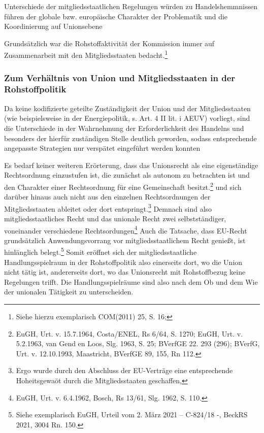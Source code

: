 \documentclass[12pt,a4paper,oneside]{book} %
\begin{document}
	Unterschiede der mitgliedsstaatlichen Regelungen würden zu Handelshemmnissen führen
	der globale bzw. europäische Charakter der Problematik und die Koordinierung auf Unionsebene
	
	
	Grundsätzlich war die Rohstoffaktivität der Kommission immer auf Zusammenarbeit mit den Mitgliedsstaaten bedacht.\footnote{Siehe hierzu exemplarisch COM(2011) 25, S. 16;}
	
	\subsubsection{Zum Verhältnis von Union und Mitgliedsstaaten in der Rohstoffpolitik}
	
	Da keine kodifizierte geteilte Zuständigkeit der Union und der Mitgliedsstaaten (wie beispielsweise in der Energiepolitik, s. Art. 4 II lit. i AEUV) vorliegt, sind die Unterschiede in der Wahrnehmung der Erforderlichkeit des Handelns und besonders der hierfür zuständigen Stelle deutlich geworden, sodass entsprechende angepasste Strategien nur verspätet eingeführt werden konnten
	
	Es bedarf keiner weiteren Erörterung, dass das Unionsrecht als eine eigenständige Rechtsordnung einzustufen ist, die zunächst als autonom zu betrachten ist und den Charakter einer Rechtsordnung für eine Gemeinschaft besitzt.\footnote{EuGH, Urt. v. 15.7.1964, Costa/ENEL, Rs 6/64, S. 1270; EuGH, Urt. v. 5.2.1963, van Gend en Loos, Slg. 1963, S. 25; BVerfGE 22. 293 (296); BVerfG, Urt. v. 12.10.1993, Maastricht, BVerfGE 89, 155, Rn 112.} und sich darüber hinaus auch nicht aus den einzelnen Rechtsordnungen der Mitgliedsstaaten ableitet oder dort entspringt.\footnote{Ergo wurde durch den Abschluss der EU-Verträge eine entsprechende Hoheitsgewaöt durch die Mitgliedsstaaten geschaffen,} Demnach sind also mitgliedsstaatliches Recht und das unionale Recht \glqq zwei selbstständiger, voneinander verschiedene Rechtsordungen\grqq\footnote{EuGH, Urt. v. 6.4.1962, Bosch, Rs 13/61, Slg. 1962, S. 110.} Auch die Tatsache, dass EU-Recht grundsätzlich Anwendungsvorrang vor mitgliedsstaatlichem Recht genießt, ist hinlänglich belegt.\footnote{Siehe exemplarisch EuGH, Urteil vom 2. März 2021 – C-824/18 -, BeckRS 2021, 3004 Rn. 150.} Somit eröffnet sich der mitgliedsstaatliche Handlungsspielraum in der Rohstoffpolitik also einerseits dort, wo die Union nicht tätig ist, andererseits dort, wo das Unionsrecht mit Rohstoffbezug keine Regelungen trifft. Die Handlungsspielräume sind also nach dem Ob und dem Wie der unionalen Tätigkeit zu unterscheiden.
	
\end{document}

